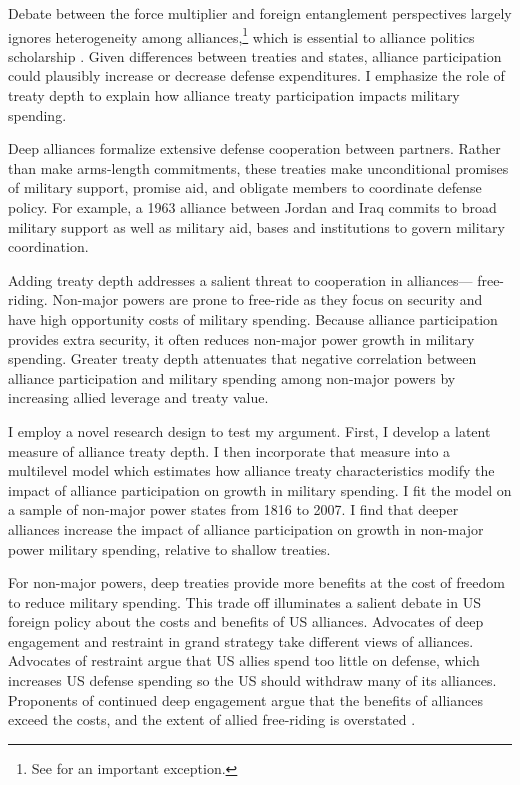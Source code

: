 \documentclass[12pt]{article}
\begin{document}
Debate between the force multiplier and foreign entanglement perspectives largely ignores heterogeneity among alliances,\footnote{See \citet{DigiuseppePoast2016} for an important exception.} which is essential to alliance politics scholarship \citep{Morrow1991, Leeds2003, LeedsAnac2005, Fordham2010, Mattes2012, Benson2012, Poast2013, Johnsonetal2015}.  
Given differences between treaties and states, alliance participation could plausibly increase or decrease defense expenditures. 
I emphasize the role of treaty depth to explain how alliance treaty participation impacts military spending. 


Deep alliances formalize extensive defense cooperation between partners.
Rather than make arms-length commitments, these treaties make unconditional promises of military support, promise aid, and obligate members to coordinate defense policy. 
For example, a 1963 alliance between Jordan and Iraq commits to broad military support as well as military aid, bases and institutions to govern military coordination. 


Adding treaty depth addresses a salient threat to cooperation in alliances--- free-riding. 
Non-major powers are prone to free-ride as they focus on security and have high opportunity costs of military spending. 
Because alliance participation provides extra security, it often reduces non-major power growth in military spending. 
Greater treaty depth attenuates that negative correlation between alliance participation and military spending among non-major powers by increasing allied leverage and treaty value. 
 

I employ a novel research design to test my argument.
First, I develop a latent measure of alliance treaty depth. 
I then incorporate that measure into a multilevel model which estimates how alliance treaty characteristics modify the impact of alliance participation on growth in military spending.
I fit the model on a sample of non-major power states from 1816 to 2007. 
I find that deeper alliances increase the impact of alliance participation on growth in non-major power military spending, relative to shallow treaties.


For non-major powers, deep treaties provide more benefits at the cost of freedom to reduce military spending. 
This trade off illuminates a salient debate in US foreign policy about the costs and benefits of US alliances.
Advocates of deep engagement \citep{Brooksetal2013} and restraint \citep{Posen2014} in grand strategy take different views of alliances. 
Advocates of restraint argue that US allies spend too little on defense, which increases US defense spending \citep{Preble2009} so the US should withdraw many of its alliances.
Proponents of continued deep engagement argue that the benefits of alliances exceed the costs, and the extent of allied free-riding is overstated \citep{BrandsFeaver2017}. 
\end{document}
